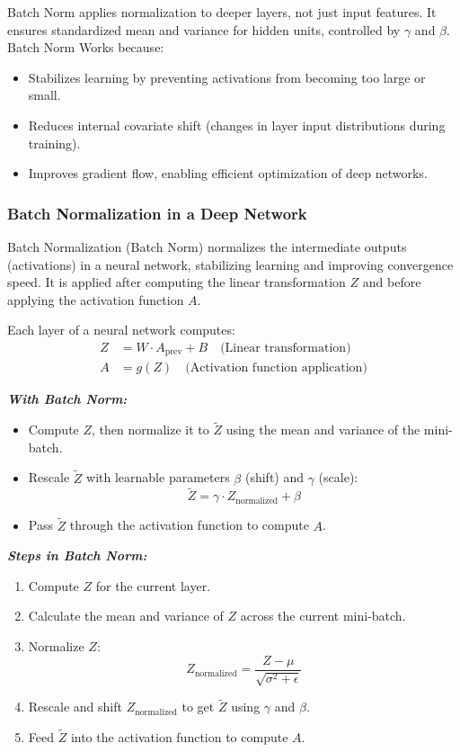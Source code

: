 \documentclass[letterpaper,12pt,notitlepage,twoside]{report}
\begin{document}
Batch Norm applies normalization to deeper layers, not just input features. It ensures standardized mean and variance for hidden units, controlled by \(\gamma\) and \(\beta\). Batch Norm Works because:
\begin{itemize}[noitemsep, topsep=0pt]
    \item Stabilizes learning by preventing activations from becoming too large or small.
    \item Reduces internal covariate shift (changes in layer input distributions during training).
    \item Improves gradient flow, enabling efficient optimization of deep networks.
\end{itemize}

\subsubsection{Batch Normalization in a Deep Network}
Batch Normalization (Batch Norm) normalizes the intermediate outputs (activations) in a neural network, stabilizing learning and improving convergence speed. It is applied after computing the linear transformation \( Z \) and before applying the activation function \( A \).

Each layer of a neural network computes:
\begin{align*}
    Z &= W \cdot A_{\text{prev}} + B \quad \text{(Linear transformation)} \\
    A &= g(Z) \quad \text{(Activation function application)}
\end{align*}

\textit{\textbf{With Batch Norm:}}
\begin{itemize}[noitemsep, topsep=0pt]
    \item Compute \( Z \), then normalize it to \( \tilde{Z} \) using the mean and variance of the mini-batch.
    \item Rescale \( \tilde{Z} \) with learnable parameters \( \beta \) (shift) and \( \gamma \) (scale):
    \[
    \tilde{Z} = \gamma \cdot Z_{\text{normalized}} + \beta
    \]
    \item Pass \( \tilde{Z} \) through the activation function to compute \( A \).
\end{itemize}

\textit{\textbf{Steps in Batch Norm:}}
\begin{enumerate}[noitemsep, topsep=0pt]
    \item Compute \( Z \) for the current layer.
    \item Calculate the mean and variance of \( Z \) across the current mini-batch.
    \item Normalize \( Z \):
    \[
    Z_{\text{normalized}} = \frac{Z - \mu}{\sqrt{\sigma^2 + \epsilon}}
    \]
    \item Rescale and shift \( Z_{\text{normalized}} \) to get \( \tilde{Z} \) using \( \gamma \) and \( \beta \).
    \item Feed \( \tilde{Z} \) into the activation function to compute \( A \).
\end{enumerate}
\end{document}
